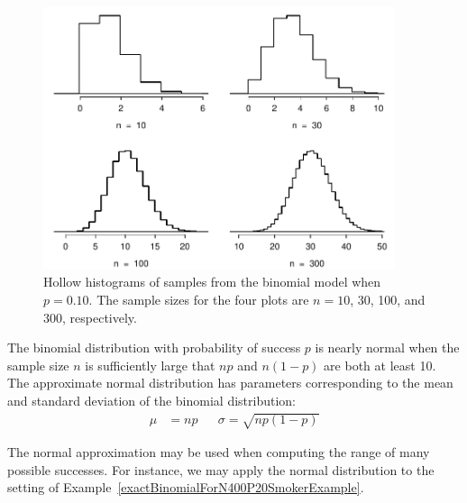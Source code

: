 \begin{figure}[h]
\centering
\includegraphics[width=0.92\textwidth]{ch_distributions/figures/fourBinomialModelsShowingApproxToNormal/fourBinomialModelsShowingApproxToNormal}
\caption{Hollow histograms of samples from the binomial model when $p=0.10$. The sample sizes for the four plots are $n=10$, 30, 100, and 300, respectively.}
\label{fourBinomialModelsShowingApproxToNormal}
\end{figure}

\begin{termBox}{
The binomial distribution with probability of success $p$ is nearly normal when the sample size $n$ is sufficiently large that $np$ and $n(1-p)$ are both at least 10. The approximate normal distribution has parameters corresponding to the mean and standard deviation of the binomial distribution:\vspace{-1.5mm}
\begin{align*}
\mu &= np
&&\sigma= \sqrt{np(1-p)}
\end{align*}}
\end{termBox}

The normal approximation may be used when computing the range of many possible successes. For instance, we may apply the normal distribution to the setting of Example~\ref{exactBinomialForN400P20SmokerExample}.

